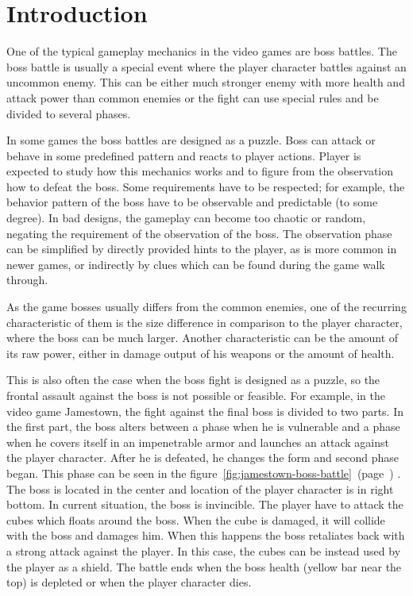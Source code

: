 \documentclass[a4paper]{article}
\newcommand{\reffigure}[1]
{
	figure~\ref{fig:#1}~(page~\pageref{fig:#1})%
}
\begin{document}
\section{Introduction}

\setcounter{page}{1}

One of the typical gameplay mechanics in the video games are boss battles. The boss battle is usually a special event where the player character battles against an uncommon enemy. This can be either much stronger enemy with more health and attack power than common enemies or the fight can use special rules and be divided to several phases.

In some games the boss battles are designed as a puzzle. Boss can attack or behave in some predefined pattern and reacts to player actions. Player is expected to study how this mechanics works and to figure from the observation how to defeat the boss. Some requirements have to be respected; for example, the behavior pattern of the boss have to be observable and predictable (to some degree). In bad designs, the gameplay can become too chaotic or random, negating the requirement of the observation of the boss. The observation phase can be simplified by directly provided hints to the player, as is more common in newer games, or indirectly by clues which can be found during the game walk through.

As the game bosses usually differs from the common enemies, one of the recurring characteristic of them is the size difference in comparison to the player character, where the boss can be much larger. Another characteristic can be the amount of its raw power, either in damage output of his weapons or the amount of health.


This is also often the case when the boss fight is designed as a puzzle, so the frontal assault against the boss is not possible or feasible. For example, in the video game Jamestown, the fight against the final boss is divided to two parts. In the first part, the boss alters between a phase when he is vulnerable and a phase when he covers itself in an impenetrable armor and launches an attack against the player character. After he is defeated, he changes the form and second phase began. This phase can be seen in the \reffigure{jamestown-boss-battle}. The boss is located in the center and location of the player character is in right bottom. In current situation, the boss is invincible. The player have to attack the cubes which floats around the boss. When the cube is damaged, it will collide with the boss and damages him. When this happens the boss retaliates back with a strong attack against the player. In this case, the cubes can be instead used by the player as a shield. The battle ends when the boss health (yellow bar near the top) is depleted or when the player character dies.
\end{document}
